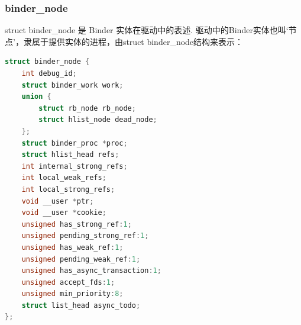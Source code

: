 \documentclass[a4paper,11pt]{article}
\begin{document}
\subsubsection{binder_node}
struct binder_node 是 Binder 实体在驱动中的表述. 驱动中的Binder实体也叫‘节点’，隶属于提供实体的进程，由struct binder_node结构来表示：

\begin{lstlisting}[language=C,multicols=2]
struct binder_node {
    int debug_id;
    struct binder_work work;
    union {
        struct rb_node rb_node;
        struct hlist_node dead_node;
    };
    struct binder_proc *proc;
    struct hlist_head refs;
    int internal_strong_refs;
    int local_weak_refs;
    int local_strong_refs;
    void __user *ptr;
    void __user *cookie;
    unsigned has_strong_ref:1;
    unsigned pending_strong_ref:1;
    unsigned has_weak_ref:1;
    unsigned pending_weak_ref:1;
    unsigned has_async_transaction:1;
    unsigned accept_fds:1;
    unsigned min_priority:8;
    struct list_head async_todo;
};
\end{lstlisting}
\end{document}
